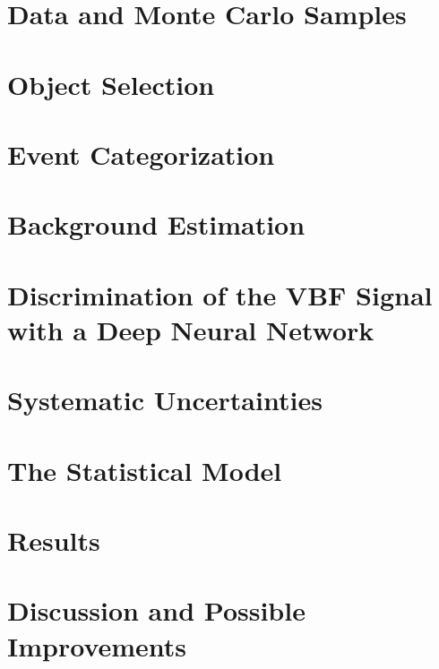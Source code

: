 \section{Data and Monte Carlo Samples}
\label{sec:data-mc-samples}



\section{Object Selection}
\label{sec:object-selection}



\section{Event Categorization}
\label{sec:event-categorization}



\section{Background Estimation}
\label{sec:bkg-estimation}


\section{Discrimination of the VBF Signal with a Deep Neural Network}
\label{sec:dnn}



\section{Systematic Uncertainties}
\label{sec:systematics}



\section{The Statistical Model}
\label{sec:stats-analysis}


\FloatBarrier
\section{Results}
\label{sec:hww-results}


\FloatBarrier
\section{Discussion and Possible Improvements}
\label{sec:hww:summary}

